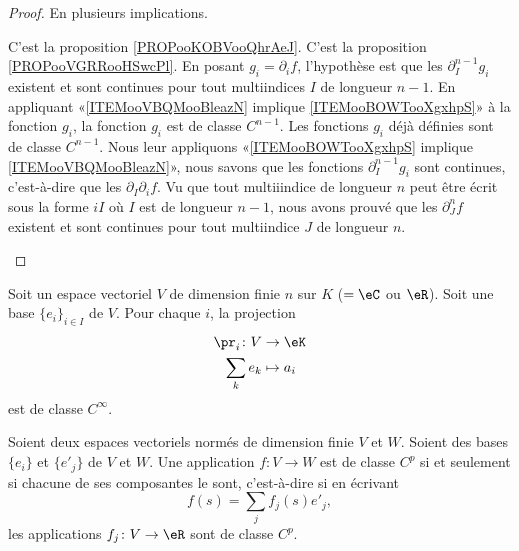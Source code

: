 \begin{proof}
	En plusieurs implications.
	\begin{subproof}
		C'est la proposition \ref{PROPooKOBVooQhrAeJ}.
		C'est la proposition \ref{PROPooVGRRooHSwcPl}.
		En posant \( g_i=\partial_if\), l'hypothèse est que les \( \partial^{n-1}_Ig_i\) existent et sont continues pour tout multiindices \( I\) de longueur \( n-1\). En appliquant «\ref{ITEMooVBQMooBleazN} implique \ref{ITEMooBOWTooXgxhpS}» à la fonction \( g_i\), la fonction \( g_i\) est de classe \( C^{n-1}\).
		Les fonctions \( g_i\) déjà définies sont de classe \( C^{n-1}\). Nous leur appliquons «\ref{ITEMooBOWTooXgxhpS} implique \ref{ITEMooVBQMooBleazN}», nous savons que les fonctions \( \partial^{n-1}_Ig_i\) sont continues, c'est-à-dire que les \( \partial_I\partial_if\). Vu que tout multiiindice de longueur \( n\) peut être écrit sous la forme \( iI\) où \( I\) est de longueur \( n-1\), nous avons prouvé que les \( \partial^n_Jf\) existent et sont continues pour tout multiindice \( J\) de longueur \( n\).
	\end{subproof}
\end{proof}

\begin{proposition}		\label{PROPooCKROooYutfEX}
	Soit un espace vectoriel \( V\) de dimension finie \( n\) sur \( K\) (\( =\eC\) ou \( \eR\)). Soit une base \( \{ e_i \}_{i\in I}\) de \( V\). Pour chaque \( i\), la projection
	\begin{equation}
		\begin{aligned}
			\pr_i\colon V & \to \eK     \\
			\sum_ke_k     & \mapsto a_i
		\end{aligned}
	\end{equation}
	est de classe \( C^{\infty}\).
\end{proposition}
\ssdem

\begin{proposition}		\label{PROPooMOMMooDYIayv}
	Soient deux espaces vectoriels normés de dimension finie \( V\) et \( W\). Soient des bases \( \{ e_i \}\) et \( \{ e'_j \}\) de \( V\) et \( W\). Une application \(f \colon V\to W  \) est de classe \( C^p\) si et seulement si chacune de ses composantes le sont, c'est-à-dire si en écrivant
	\begin{equation}
		f(s)=\sum_jf_j(s)e'_j,
	\end{equation}
	les applications \(f_j \colon V\to \eR  \) sont de classe \( C^p\).
\end{proposition}

